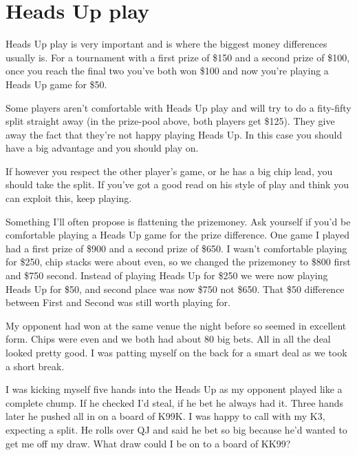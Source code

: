 \chapter{Heads Up play}


Heads Up play is very important and is where the biggest money
differences usually is. For a tournament with
a first prize of \$150 and a second prize of \$100, once
you reach the final two you've both won \$100 and now you're
playing a Heads Up game for \$50.



Some players aren't comfortable with Heads Up play
and will try to do a fity-fifty split straight away (in the prize-pool
above, both players get \$125). They give away the
fact that they're not happy playing Heads Up. In this case
you should have a big advantage and you should play on.

If however you respect the other player's game, or he
has a big chip lead, you should take the split. If you've
got a good read on his style of play and think you
can exploit this, keep playing.

Something I'll often propose is flattening the prizemoney.
Ask yourself if you'd be comfortable playing a Heads Up
game for the prize difference. One game I played had
a first prize of \$900 and a second prize of \$650. I wasn't
comfortable playing for \$250, chip stacks were about even,
so we changed the prizemoney to \$800 first and \$750 second.
Instead of playing Heads Up for \$250 we were now playing
Heads Up for \$50, and second place was now \$750
not \$650. That \$50 difference between
First and Second was still worth playing for.

My opponent had won at the same venue the night before
so seemed in excellent form. Chips were even and we both
had about 80 big bets. All in all the deal looked
pretty good. I was patting myself on the back for a smart
deal as we took a short break.

I was kicking myself five hands into the
Heads Up as my opponent played like a complete chump.
If he checked I'd steal, if he bet he always had it.
Three hands later he pushed all in on a board of K99K.
I was happy to call with my K3, expecting a split.
He rolls over QJ and said he bet so big because he'd
wanted to get me off my draw. What draw could I be
on to a board of KK99?

